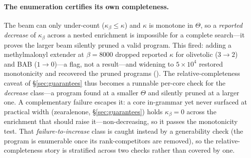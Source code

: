 \paragraph{The enumeration certifies its own completeness.} The beam can only under-count
($\kappa_\beta\le\kappa$) and $\kappa$ is monotone in $\Theta$, so a \emph{reported decrease} of
$\kappa_\beta$ across a nested enrichment is impossible for a complete search---it proves the larger beam
silently pruned a valid program. This fired: adding a methylmalonyl extender at $\beta{=}8000$ dropped
reported $\kappa$ for olivetolic ($3\to2$) and BAB ($1\to0$)---a flag, not a result---and widening to
$5\times10^4$ restored monotonicity and recovered the pruned programs (). The
relative-completeness caveat of \S\ref{sec:guarantees} thus becomes a runnable per-core check for the
\emph{decrease} class---a program found at a smaller $\Theta$ and silently pruned at a larger one. A
complementary failure escapes it: a core in-grammar yet never surfaced at practical width (zearalenone,
\S\ref{sec:guarantees}) holds $\kappa_\beta{=}0$ across the enrichment that should raise it---non-decreasing,
so it passes the monotonicity test. That \emph{failure-to-increase} class is caught instead by a
generability check (the program is enumerable once its rank-competitors are removed), so the
relative-completeness story is stratified across two checks rather than covered by one.
